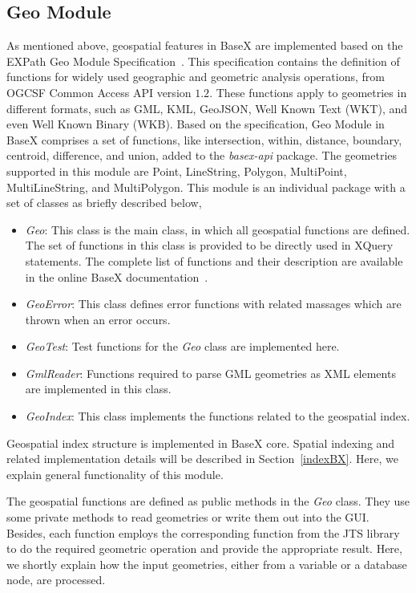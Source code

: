 \documentclass[a4paper,12pt]{article}
\begin{document}
\subsection{Geo Module}
\label{geomodule}
As mentioned above, geospatial features in BaseX are implemented based on the EXPath Geo Module Specification~\cite{expath}. This specification contains the definition of functions for widely used geographic and geometric analysis operations, from OGCSF Common Access API version $1.2$. These functions apply to geometries in different formats, such as GML, KML, GeoJSON, Well Known Text (WKT), and even Well Known Binary (WKB). Based on the specification, Geo Module in BaseX comprises a set of functions, like intersection, within, distance, boundary, centroid, difference, and union, added to the \textit{basex-api} package. The geometries supported in this module are Point, LineString, Polygon, MultiPoint, MultiLineString, and MultiPolygon. This module is an individual package with a set of classes as briefly described below,
\begin{itemize}
\item \textit{Geo}: This class is the main class, in which all geospatial functions are defined. The set of functions in this class is provided to be directly used in XQuery statements. The complete list of functions and their description are available in the online BaseX documentation~\cite{basexgeo}.
\item \textit{GeoError}: This class defines error functions with related massages which are thrown when an error occurs.
\item \textit{GeoTest}: Test functions for the \textit{Geo} class are implemented here.
\item \textit{GmlReader}: Functions required to parse GML geometries as XML elements are implemented in this class.
\item \textit{GeoIndex}: This class implements the functions related to the geospatial index. 
\end{itemize}

Geospatial index structure is implemented in BaseX core. Spatial indexing and related implementation details will be described in Section~\ref{indexBX}. Here, we explain general functionality of this module.

The geospatial functions are defined as public methods in the \textit{Geo} class. They use some private methods to read geometries or write them out into the GUI. Besides, each function employs the corresponding function from the JTS library to do the required geometric operation and provide the appropriate result. Here, we shortly explain how the input geometries, either from a variable or a database node, are processed.
\end{document}
